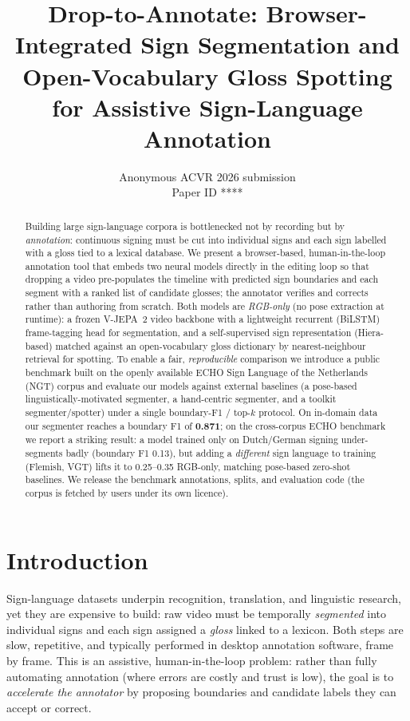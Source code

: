 \documentclass[10pt,twocolumn]{article}
\title{\vspace{-8mm}\textbf{Drop-to-Annotate: Browser-Integrated Sign Segmentation
and Open-Vocabulary Gloss Spotting for Assistive Sign-Language Annotation}}
\author{Anonymous ACVR 2026 submission\\ \small Paper ID ****}
\date{}
\begin{document}
\maketitle

\begin{abstract}
Building large sign-language corpora is bottlenecked not by recording but by
\emph{annotation}: continuous signing must be cut into individual signs and each sign
labelled with a gloss tied to a lexical database. We present a browser-based,
human-in-the-loop annotation tool that embeds two neural models directly in the editing
loop so that dropping a video pre-populates the timeline with predicted sign boundaries and
each segment with a ranked list of candidate glosses; the annotator verifies and corrects
rather than authoring from scratch. Both models are \emph{RGB-only} (no pose extraction at
runtime): a frozen V-JEPA~2 video backbone with a lightweight recurrent (BiLSTM) frame-tagging
head for segmentation, and a self-supervised sign representation (Hiera-based) matched against
an open-vocabulary gloss dictionary by nearest-neighbour retrieval for spotting. To enable a
fair, \emph{reproducible} comparison we introduce a public benchmark built on the openly
available ECHO Sign Language of the Netherlands (NGT) corpus and evaluate our models against
external baselines (a pose-based linguistically-motivated segmenter, a hand-centric segmenter,
and a toolkit segmenter/spotter) under a single boundary-F1 / top-$k$ protocol. On in-domain
data our segmenter reaches a boundary F1 of \textbf{0.871}; on the cross-corpus ECHO benchmark
we report a striking result: a model trained only on Dutch/German signing under-segments badly
(boundary F1 0.13), but adding a \emph{different} sign language to training (Flemish, VGT) lifts it
to 0.25--0.35 RGB-only, matching pose-based zero-shot baselines. We release the benchmark annotations, splits, and
evaluation code (the corpus is fetched by users under its own licence).
\end{abstract}

\section{Introduction}
Sign-language datasets underpin recognition, translation, and linguistic research, yet they
are expensive to build: raw video must be temporally \emph{segmented} into individual signs and
each sign assigned a \emph{gloss} linked to a lexicon. Both steps are slow, repetitive, and
typically performed in desktop annotation software, frame by frame. This is an assistive,
human-in-the-loop problem: rather than fully automating annotation (where errors are costly and
trust is low), the goal is to \emph{accelerate the annotator} by proposing boundaries and
candidate labels they can accept or correct.
\end{document}
